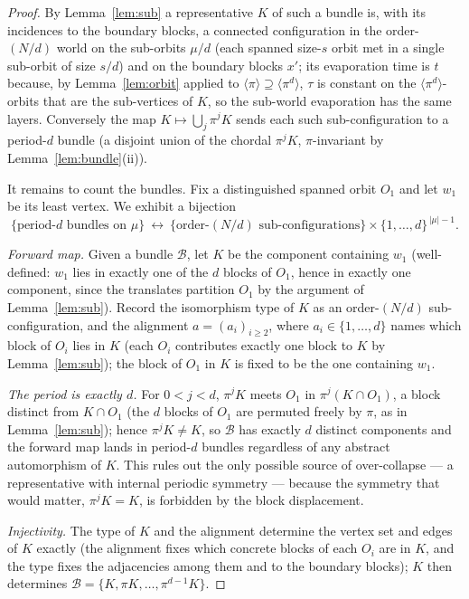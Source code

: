 \documentclass[11pt]{article}
\theoremstyle{plain}
\theoremstyle{definition}
\newcommand{\orb}{\mathcal{B}}
\begin{document}
\begin{proof}
By Lemma~\ref{lem:sub} a representative $K$ of such a bundle is, with its incidences to the boundary
blocks, a connected configuration in the order-$(N/d)$ world on the sub-orbits $\mu/d$ (each spanned
size-$s$ orbit met in a single sub-orbit of size $s/d$) and on the boundary blocks $x'$; its
evaporation time is $t$ because, by Lemma~\ref{lem:orbit} applied to $\langle\pi\rangle\supseteq
\langle\pi^d\rangle$, $\tau$ is constant on the $\langle\pi^d\rangle$-orbits that are the sub-vertices
of $K$, so the sub-world evaporation has the same layers. Conversely the map $K\mapsto\bigcup_j\pi^jK$
sends each such sub-configuration to a period-$d$ bundle (a disjoint union of the chordal $\pi^jK$,
$\pi$-invariant by Lemma~\ref{lem:bundle}(ii)).

It remains to count the bundles. Fix a distinguished spanned orbit $O_1$ and let $w_1$ be its least
vertex. We exhibit a bijection
\[
\big\{\text{period-}d\text{ bundles on }\mu\big\}
\ \longleftrightarrow\
\big\{\text{order-}(N/d)\text{ sub-configurations}\big\}\times\{1,\dots,d\}^{\,|\mu|-1}.
\]

\emph{Forward map.} Given a bundle $\orb$, let $K$ be the component containing $w_1$ (well-defined:
$w_1$ lies in exactly one of the $d$ blocks of $O_1$, hence in exactly one component, since the
translates partition $O_1$ by the argument of Lemma~\ref{lem:sub}). Record the isomorphism type of
$K$ as an order-$(N/d)$ sub-configuration, and the alignment $a=(a_i)_{i\ge2}$, where $a_i\in\{1,\dots,d\}$
names which block of $O_i$ lies in $K$ (each $O_i$ contributes exactly one block to $K$ by
Lemma~\ref{lem:sub}); the block of $O_1$ in $K$ is fixed to be the one containing $w_1$.

\emph{The period is exactly $d$.} For $0<j<d$, $\pi^{j}K$ meets $O_1$ in $\pi^{j}(K\cap O_1)$, a
block distinct from $K\cap O_1$ (the $d$ blocks of $O_1$ are permuted freely by $\pi$, as in
Lemma~\ref{lem:sub}); hence $\pi^{j}K\neq K$, so $\orb$ has exactly $d$ distinct components and the
forward map lands in period-$d$ bundles regardless of any abstract automorphism of $K$. This rules
out the only possible source of over-collapse — a representative with internal periodic symmetry —
because the symmetry that would matter, $\pi^{j}K=K$, is forbidden by the block displacement.

\emph{Injectivity.} The type of $K$ and the alignment determine the vertex set and edges of $K$
exactly (the alignment fixes which concrete blocks of each $O_i$ are in $K$, and the type fixes the
adjacencies among them and to the boundary blocks); $K$ then determines $\orb=\{K,\pi K,\dots,\pi^{d-1}K\}$.


\end{proof}
\end{document}
